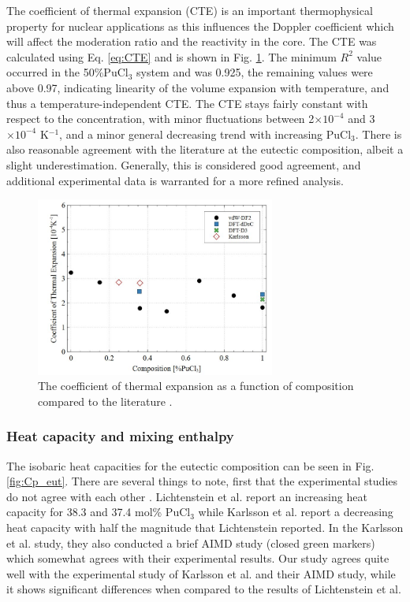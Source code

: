 \documentclass[review]{elsarticle}
\begin{document}
The coefficient of thermal expansion (CTE) is an important thermophysical property for nuclear applications as this influences the Doppler coefficient which will affect the moderation ratio and the reactivity in the core. The CTE was calculated using Eq. \ref{eq:CTE} and is shown in Fig. \ref{fig:CTE}. The minimum $R^2$ value occurred in the 50\%PuCl$_3$ system and was 0.925, the remaining values were above 0.97, indicating linearity of the volume expansion with temperature, and thus a temperature-independent CTE. The CTE stays fairly constant with respect to the concentration, with minor fluctuations between 2$\times10^{-4}$ and 3$\times10^{-4}$ K$^{-1}$, and a minor general decreasing trend with increasing PuCl$_3$. There is also reasonable agreement with the literature \cite{karlsson2022synthesis} at the eutectic composition, albeit a slight underestimation. Generally, this is considered good agreement, and additional experimental data is warranted for a more refined analysis. 

\begin{figure}[h!]
 \centering
 \includegraphics[width=0.7\textwidth]{CTE.jpg} 
 \caption{The coefficient of thermal expansion as a function of composition compared to the literature \cite{karlsson2022synthesis}.}
 \label{fig:CTE}
\end{figure} 

\subsubsection{Heat capacity and mixing enthalpy}

The isobaric heat capacities for the eutectic composition can be seen in Fig. \ref{fig:Cp_eut}. There are several things to note, first that the experimental studies do not agree with each other \cite{karlsson2022synthesis, lichtenstein2022property}. Lichtenstein et al. report an increasing heat capacity for 38.3 and 37.4 mol\% PuCl$_3$ while Karlsson et al. report a decreasing heat capacity with half the magnitude that Lichtenstein reported. In the Karlsson et al. study, they also conducted a brief AIMD study (closed green markers) which somewhat agrees with their experimental results. Our study agrees quite well with the experimental study of Karlsson et al. and their AIMD study, while it shows significant differences when compared to the results of Lichtenstein et al.
\end{document}
